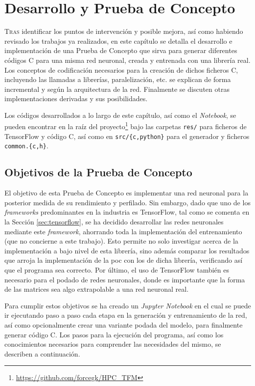 \chapter{Desarrollo y Prueba de Concepto}
\label{chap:desarrollo_poc}

\lettrine{T}{ras} identificar los puntos de intervención y posible mejora, así como habiendo revisado los trabajos ya realizados, en este capítulo se detalla el desarrollo e implementación de una Prueba de Concepto que sirva para generar diferentes códigos C para una misma red neuronal, creada y entrenada con una librería real. Los conceptos de codificación necesarios para la creación de dichos ficheros C, incluyendo las llamadas a librerías, paralelización, etc. se explican de forma incremental y según la arquitectura de la red. Finalmente se discuten otras implementaciones derivadas y sus posibilidades.

Los códigos desarrollados a lo largo de este capítulo, así como el \textit{Notebook}, se pueden encontrar en la raíz del proyecto\footnote{\url{https://github.com/forcegk/HPC_TFM}} bajo las carpetas \texttt{res/} para ficheros de TensorFlow y código C, así como en \texttt{src/\{c,python\}} para el generador y ficheros \texttt{common.\{c,h\}}.

\section{Objetivos de la Prueba de Concepto}
\label{sec:objetivos_poc}
El objetivo de esta Prueba de Concepto es implementar una red neuronal para la posterior medida de su rendimiento y perfilado. Sin embargo, dado que uno de los \textit{frameworks} predominantes en la industria es TensorFlow, tal como se comenta en la Sección \ref{sec:tensorflow}, se ha decidido desarrollar las redes neuronales mediante este \textit{framework}, ahorrando toda la implementación del entrenamiento (que no concierne a este trabajo). Esto permite no solo investigar acerca de la implementación a bajo nivel de esta librería, sino además comparar los resultados que arroja la implementación de la \acrshort{poc} con los de dicha librería, verificando así que el programa sea correcto. Por último, el uso de TensorFlow también es necesario para el podado de redes neuronales, donde es importante que la forma de las matrices sea algo extrapolable a una red neuronal real.

Para cumplir estos objetivos se ha creado un \textit{Jupyter Notebook} en el cual se puede ir ejecutando paso a paso cada etapa en la generación y entrenamiento de la red, así como opcionalmente crear una variante podada del modelo, para finalmente generar código C. Los pasos para la ejecución del programa, así como los conocimientos necesarios para comprender las necesidades del mismo, se describen a continuación.

